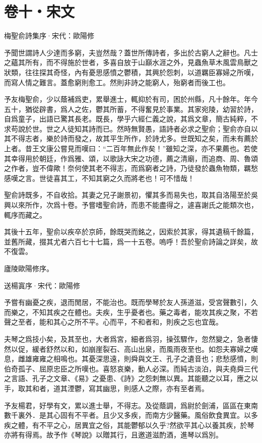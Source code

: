 \documentclass[12pt,a4paper]{ctexbook}
\begin{document}
\section{卷十・宋文}
梅聖俞詩集序·宋代：歐陽修 \par
予聞世謂詩人少達而多窮，夫豈然哉？蓋世所傳詩者，多出於古窮人之辭也。凡士之蘊其所有，而不得施於世者，多喜自放于山巔水涯之外，見蟲魚草木風雲鳥獸之狀類，往往探其奇怪，內有憂思感憤之鬱積，其興於怨刺，以道羈臣寡婦之所嘆，而寫人情之難言。蓋愈窮則愈工。然則非詩之能窮人，殆窮者而後工也。\par
予友梅聖俞，少以蔭補爲吏，累舉進士，輒抑於有司，困於州縣，凡十餘年。年今五十，猶從辟書，爲人之佐，鬱其所蓄，不得奮見於事業。其家宛陵，幼習於詩，自爲童子，出語已驚其長老。既長，學乎六經仁義之說，其爲文章，簡古純粹，不求苟說於世。世之人徒知其詩而已。然時無賢愚，語詩者必求之聖俞；聖俞亦自以其不得志者，樂於詩而發之，故其平生所作，於詩尤多。世既知之矣，而未有薦於上者。昔王文康公嘗見而嘆曰：“二百年無此作矣！”雖知之深，亦不果薦也。若使其幸得用於朝廷，作爲雅、頌，以歌詠大宋之功德，薦之清廟，而追商、周、魯頌之作者，豈不偉歟！奈何使其老不得志，而爲窮者之詩，乃徒發於蟲魚物類，羈愁感嘆之言。世徒喜其工，不知其窮之久而將老也！可不惜哉！\par
聖俞詩既多，不自收拾。其妻之兄子謝景初，懼其多而易失也，取其自洛陽至於吳興以來所作，次爲十卷。予嘗嗜聖俞詩，而患不能盡得之，遽喜謝氏之能類次也，輒序而藏之。\par
其後十五年，聖俞以疾卒於京師，餘既哭而銘之，因索於其家，得其遺稿千餘篇，並舊所藏，掇其尤者六百七十七篇，爲一十五卷。嗚呼！吾於聖俞詩論之詳矣，故不復雲。\par
廬陵歐陽修序。\par
送楊寘序·宋代：歐陽修 \par
予嘗有幽憂之疾，退而閒居，不能治也。既而學琴於友人孫道滋，受宮聲數引，久而樂之，不知其疾之在體也。夫疾，生乎憂者也。藥之毒者，能攻其疾之聚，不若聲之至者，能和其心之所不平。心而平，不和者和，則疾之忘也宜哉。\par
夫琴之爲技小矣，及其至也，大者爲宮，細者爲羽，操弦驟作，忽然變之，急者悽然以促，緩者舒然以和，如崩崖裂石、高山出泉，而風雨夜至也。如怨夫寡婦之嘆息，雌雄雍雍之相鳴也。其憂深思遠，則舜與文王、孔子之遺音也；悲愁感憤，則伯奇孤子、屈原忠臣之所嘆也。喜怒哀樂，動人必深。而純古淡泊，與夫堯舜三代之言語、孔子之文章、《易》之憂患、《詩》之怨刺無以異。其能聽之以耳，應之以手，取其和者，道其湮鬱，寫其幽思，則感人之際，亦有至者焉。\par
予友楊君，好學有文，累以進士舉，不得志。及從蔭調，爲尉於劍浦，區區在東南數千裏外．是其心固有不平者。且少又多疾，而南方少醫藥。風俗飲食異宜。以多疾之體，有不平之心，居異宜之俗，其能鬱郁以久乎?然欲平其心以養其疾，於琴亦將有得焉。故予作《琴說》以贈其行，且邀道滋酌酒，進琴以爲別。\par
\end{document}

